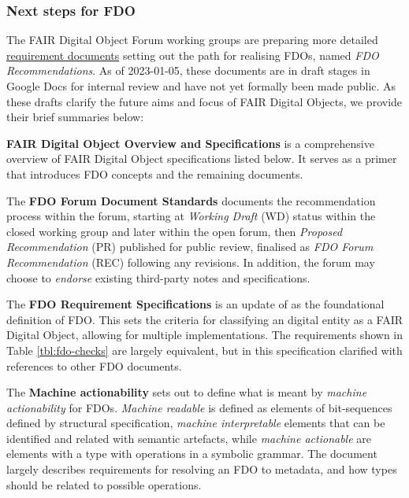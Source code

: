 \documentclass[fleqn,10pt,lineno]{wlpeerjlua}
\begin{document}
\hypertarget{sec:next-step-fdo}{%
\subsubsection*{Next steps for FDO}\label{sec:next-step-fdo}}

The FAIR Digital Object Forum \cite{DMEBhHID} working groups are preparing more detailed \href{https://docs.google.com/spreadsheets/d/1O1PTLmVWqjQgvJsIcPgaZJe9BntHZt8_QndEG0eRwUY/edit}{requirement documents} setting out the path for realising FDOs, named \emph{FDO Recommendations}. As of 2023-01-05, these documents are in draft stages in Google Docs for internal review and have not yet formally been made public. As these drafts clarify the future aims and focus of FAIR Digital Objects, we provide their brief summaries below:

\textbf{FAIR Digital Object Overview and Specifications} \cite{11NpETLq1} is a comprehensive overview of FAIR Digital Object specifications listed below. It serves as a primer that introduces FDO concepts and the remaining documents.

The \textbf{FDO Forum Document Standards} \cite{TQdku4YF} documents the recommendation process within the forum, starting at \emph{Working Draft} (WD) status within the closed working group and later within the open forum, then \emph{Proposed Recommendation} (PR) published for public review, finalised as \emph{FDO Forum Recommendation} (REC) following any revisions. In addition, the forum may choose to \emph{endorse} existing third-party notes and specifications.

The \textbf{FDO Requirement Specifications} \cite{yygVPoL0} is an update of \cite{RwvirqWg} as the foundational definition of FDO. This sets the criteria for classifying an digital entity as a FAIR Digital Object, allowing for multiple implementations. The requirements shown in Table \ref{tbl:fdo-checks} are largely equivalent, but in this specification clarified with references to other FDO documents.

The \textbf{Machine actionability} \cite{iJeys0T5} sets out to define what is meant by \emph{machine actionability} for FDOs. \emph{Machine readable} is defined as elements of bit-sequences defined by structural specification, \emph{machine interpretable} elements that can be identified and related with semantic artefacts, while \emph{machine actionable} are elements with a type with operations in a symbolic grammar. The document largely describes requirements for resolving an FDO to metadata, and how types should be related to possible operations.
\end{document}
